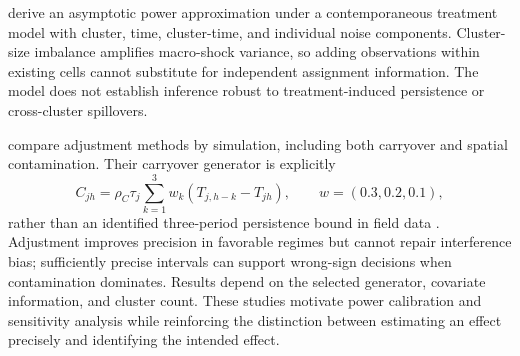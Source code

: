 \citet{pankratev2026power} derive an asymptotic power approximation under a contemporaneous treatment model with cluster, time, cluster-time, and individual noise components. Cluster-size imbalance amplifies macro-shock variance, so adding observations within existing cells cannot substitute for independent assignment information. The model does not establish inference robust to treatment-induced persistence or cross-cluster spillovers.

\citet{pankratev2026variance} compare adjustment methods by simulation, including both carryover and spatial contamination. Their carryover generator is explicitly
\[
 C_{jh}=\rho_C\tau_j\sum_{k=1}^{3}w_k(T_{j,h-k}-T_{jh}),
 \qquad w=(0.3,0.2,0.1),
\]
rather than an identified three-period persistence bound in field data \citep[Equation~(3), p.~6]{pankratev2026variance}. Adjustment improves precision in favorable regimes but cannot repair interference bias; sufficiently precise intervals can support wrong-sign decisions when contamination dominates. Results depend on the selected generator, covariate information, and cluster count. These studies motivate power calibration and sensitivity analysis while reinforcing the distinction between estimating an effect precisely and identifying the intended effect.
